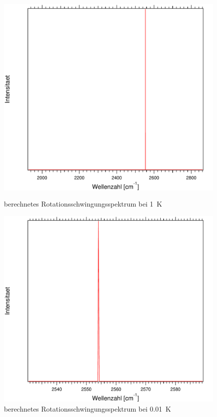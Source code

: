 \begin{figure}[H]
\centering	
	\begin{minipage}{0.47\linewidth}
	\includegraphics[width=\linewidth]{Bilder/1HCl.pdf}
	\caption{berechnetes Rotationsschwingungsspektrum bei 1~K}
	\end{minipage}
\begin{minipage}{0.47\linewidth}
	\includegraphics[width=\linewidth]{Bilder/001HCl.pdf}
	\caption{berechnetes Rotationsschwingungsspektrum bei 0.01~K}	
	\label{Rot:001HCl}
	\end{minipage}
	
	
	
	
\end{figure}




\printbibliography